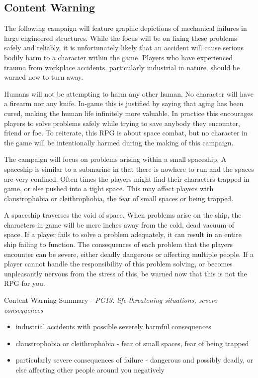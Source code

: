 \documentclass[a4paper]{article}
\begin{document}
\subsection{Content Warning}

The following campaign will feature graphic depictions of mechanical failures in large engineered structures. While the focus will be on fixing these problems safely and reliably, it is unfortunately likely that an accident will cause serious bodily harm to a character within the game. Players who have experienced trauma from workplace accidents, particularly industrial in nature, should be warned now to turn away. 

Humans will not be attempting to harm any other human. No character will have a firearm nor any knife. In-game this is justified by saying that aging has been cured, making the human life infinitely more valuable. In practice this encourages players to solve problems safely while trying to save anybody they encounter, friend or foe. To reiterate, this RPG is about space combat, but no character in the game will be intentionally harmed during the making of this campaign.

The campaign will focus on problems arising within a small spaceship. A spaceship is similar to a submarine in that there is nowhere to run and the spaces are very confined. Often times the players might find their characters trapped in game, or else pushed into a tight space. This may affect players with claustrophobia or cleithrophobia, the fear of small spaces or being trapped.

A spaceship traverses the void of space. When problems arise on the ship, the characters in game will be mere inches away from the cold, dead vacuum of space. If a player fails to solve a problem adequately, it can result in an entire ship failing to function. The consequences of each problem that the players encounter can be severe, either deadly dangerous or affecting multiple people. If a player cannot handle the responsibility of this problem solving, or becomes unpleasantly nervous from the stress of this, be warned now that this is not the RPG for you.

\vspace{0.5cm} \hspace{-18pt} Content Warning Summary - \textit{PG13: life-threatening situations, severe consequences}
\begin{itemize}
\item industrial accidents with possible severely harmful consequences
\item claustrophobia or cleithrophobia - fear of small spaces, fear of being trapped
\item particularly severe consequences of failure - dangerous and possibly deadly, or else affecting other people around you negatively
\end{itemize}
\end{document}
